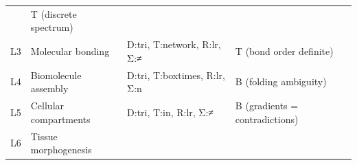 \documentclass[12pt,a4paper]{article}
\begin{document}
\begin{longtable}[]{@{}llll@{}}
\begin{minipage}[t]{0.27\columnwidth}
\end{minipage} & \begin{minipage}[t]{0.25\columnwidth}\raggedright
T (discrete spectrum)\strut
\end{minipage}\tabularnewline
\begin{minipage}[t]{0.13\columnwidth}\raggedright
L3\strut
\end{minipage} & \begin{minipage}[t]{0.23\columnwidth}\raggedright
Molecular bonding\strut
\end{minipage} & \begin{minipage}[t]{0.27\columnwidth}\raggedright
D:tri, T:network, R:lr, Σ:≠\strut
\end{minipage} & \begin{minipage}[t]{0.25\columnwidth}\raggedright
T (bond order definite)\strut
\end{minipage}\tabularnewline
\begin{minipage}[t]{0.13\columnwidth}\raggedright
L4\strut
\end{minipage} & \begin{minipage}[t]{0.23\columnwidth}\raggedright
Biomolecule assembly\strut
\end{minipage} & \begin{minipage}[t]{0.27\columnwidth}\raggedright
D:tri, T:boxtimes, R:lr, Σ:n\strut
\end{minipage} & \begin{minipage}[t]{0.25\columnwidth}\raggedright
B (folding ambiguity)\strut
\end{minipage}\tabularnewline
\begin{minipage}[t]{0.13\columnwidth}\raggedright
L5\strut
\end{minipage} & \begin{minipage}[t]{0.23\columnwidth}\raggedright
Cellular compartments\strut
\end{minipage} & \begin{minipage}[t]{0.27\columnwidth}\raggedright
D:tri, T:in, R:lr, Σ:≠\strut
\end{minipage} & \begin{minipage}[t]{0.25\columnwidth}\raggedright
B (gradients = contradictions)\strut
\end{minipage}\tabularnewline
\begin{minipage}[t]{0.13\columnwidth}\raggedright
L6\strut
\end{minipage} & \begin{minipage}[t]{0.23\columnwidth}\raggedright
Tissue morphogenesis\strut

\end{minipage}
\end{longtable}
\end{document}
